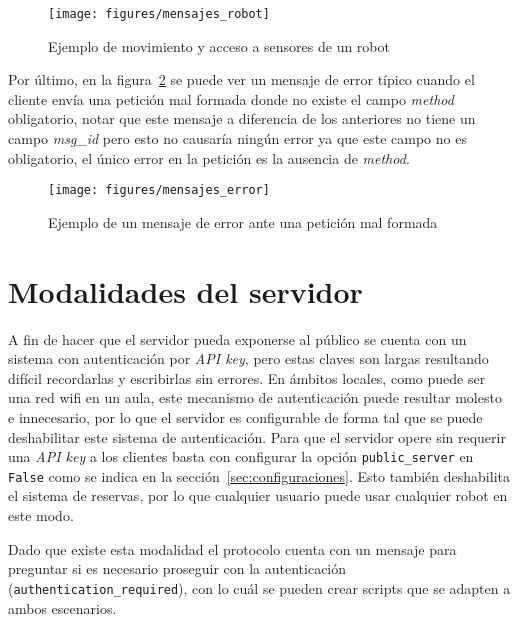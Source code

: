 \begin{figure}
    \centering
    \texttt{[image: figures/mensajes\_robot]}
    \caption{Ejemplo de movimiento y acceso a sensores de un robot}
    \label{fig:ej_movimiento_y_sensor}
\end{figure}

Por último, en la figura~\ref{fig:ej_error} se puede ver un mensaje de error
típico cuando el cliente envía una petición mal formada donde no existe
el campo \textit{method} obligatorio, notar que este mensaje a diferencia
de los anteriores no tiene un campo \textit{msg\_id} pero esto no causaría
ningún error ya que este campo no es obligatorio, el único error en la
petición es la ausencia de \textit{method}.

\begin{figure}
    \centering
    \texttt{[image: figures/mensajes\_error]}
    \caption{Ejemplo de un mensaje de error ante una petición mal formada}
    \label{fig:ej_error}
\end{figure}

\section{Modalidades del servidor}

A fin de hacer que el servidor pueda exponerse al público se cuenta con
un sistema con autenticación por \textit{API key}, pero estas claves
son largas resultando difícil recordarlas y escribirlas sin errores. En
ámbitos locales, como puede ser una red wifi en un aula, este mecanismo
de autenticación puede resultar molesto e innecesario, por lo que el
servidor es configurable de forma tal que se puede deshabilitar este
sistema de autenticación. Para que el servidor opere sin requerir
una \textit{API key} a los clientes basta con configurar la opción
\texttt{public\_server} en \texttt{False} como se indica en la
sección~\ref{sec:configuraciones}. Esto también deshabilita
el sistema de reservas, por lo que cualquier usuario puede usar
cualquier robot en este modo.

Dado que existe esta modalidad el protocolo cuenta con un mensaje
para preguntar si es necesario proseguir con la autenticación
(\texttt{authentication\_required}), con lo cuál se pueden crear
scripts que se adapten a ambos escenarios.

